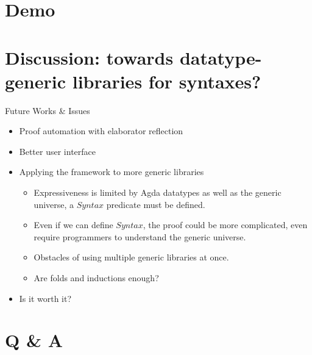 \documentclass[10pt,xcolor=svgnames,aspectratio=169]{beamer} %
\newcommand{\mi}[1]{\ensuremath{\mathit{#1}}}
\begin{document}
\section{Demo}

\section{Discussion: towards datatype-generic libraries for syntaxes?}

\begin{frame}[fragile]{Future Works \& Issues}
	\begin{itemize}
		\item Proof automation with elaborator reflection 
		\item Better user interface
		\item Applying the framework to more generic libraries
		\pause
			\begin{itemize}
				\item Expressiveness is limited by Agda datatypes as well as the generic universe, a \mi{Syntax} predicate must be defined.
				\pause
				\item Even if we can define \mi{Syntax}, the proof could be more complicated, even require programmers to understand the generic universe.
				\pause
				\item Obstacles of using multiple generic libraries at once.
				\pause
				\item Are folds and inductions enough?
			\end{itemize}
	\pause
	\item Is it worth it?
	\end{itemize}
\end{frame}

\section{Q \& A}
\end{document}
